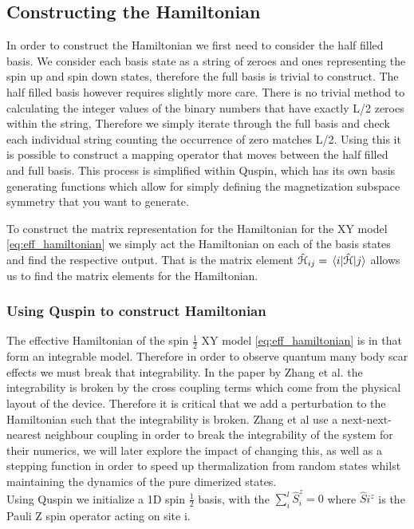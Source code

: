 \subsection{Constructing the Hamiltonian}
In order to construct the Hamiltonian we first need to consider the half filled basis. We consider each basis state as a string of zeroes and ones representing the spin up and spin down states, therefore the full basis is trivial to construct. The half filled basis however requires slightly more care. There is no trivial method to calculating the integer values of the binary numbers that have exactly L/2 zeroes within the string, Therefore we simply iterate through the full basis and check each individual string counting the occurrence of zero matches L/2. Using this it is possible to construct a mapping operator that moves between the half filled and full basis. This process is simplified within Quspin, which has its own basis generating functions which allow for simply defining the magnetization subspace symmetry that you want to generate. 

To construct the matrix representation for the Hamiltonian for the XY model \ref{eq:eff_hamiltonian} we simply act the Hamiltonian on each of the basis states and find the respective output. That is the matrix element $\hat{\mathcal{H}}_{ij} = \mel*{i}{\hat{\mathcal{H}}}{j}$ allows us to find the matrix elements for the Hamiltonian. 

\subsubsection{Using Quspin to construct Hamiltonian}

The effective Hamiltonian of the spin $\frac 1 2 $ XY model \ref{eq:eff_hamiltonian} is in that form an integrable model. Therefore in order to observe quantum many body scar effects we must break that integrability. In the paper by Zhang et al.\citep{zhang_many-body_2022} the integrability is broken by the cross coupling terms which come from the physical layout of the device. Therefore it is critical that we add a perturbation to the Hamiltonian such that the integrability is broken. 
Zhang et al\citep{zhang_many-body_2022} use a next-next-nearest neighbour coupling in order to break the integrability of the system for their numerics, we will later explore the impact of changing this, as well as a stepping function in order to speed up thermalization from random states whilst maintaining the dynamics of the pure dimerized states. \\
Using Quspin we initialize a 1D spin $\frac 1 2$ basis, with the $\sum_i^l\hat{S}^z_i = 0 $ where $\hat{S }i^z$ is the Pauli Z spin operator acting on site i. 

